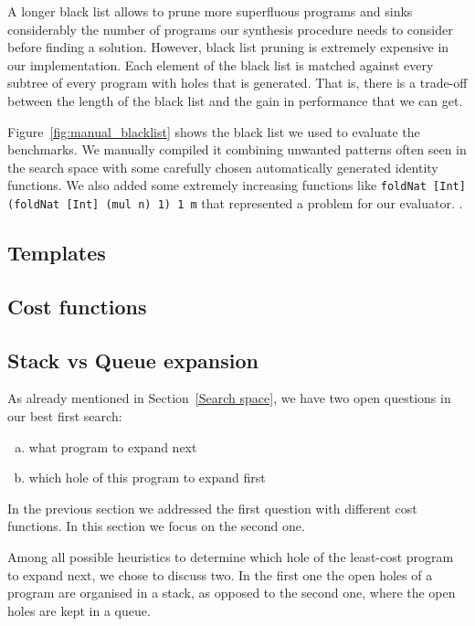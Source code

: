 A longer black list allows to prune more superfluous programs and sinks considerably the number of programs our synthesis procedure needs to consider before finding a solution. However, black list pruning is extremely expensive in our implementation. Each element of the black list is matched against every subtree of every program with holes that is generated. That is, there is a trade-off between the length of the black list and the gain in performance that we can get.

Figure~\ref{fig:manual_blacklist} shows the black list  we used to evaluate the benchmarks. We manually compiled it combining unwanted patterns often seen in the search space with some carefully chosen automatically generated identity functions. We also added some extremely increasing functions like \lstinline!foldNat [Int] (foldNat [Int] (mul n) 1) 1 m! that represented a problem for our evaluator.
.

\subsection{Templates}
\subsection{Cost functions}
\subsection{Stack vs Queue expansion}
As already mentioned in Section~\ref{Search space}, we have two open questions in our best first search:
\begin{enumerate}[a.]
\item what program to expand next
\item which hole of this program to expand first
\end{enumerate}
In the previous section we addressed the first question with different cost functions. In this section we focus on the second one.

Among all possible heuristics to determine which hole of the least-cost program to expand next, we chose to discuss two. In the first one the open holes of a program are organised in a stack, as opposed to the second one, where the open holes are kept in a queue.

